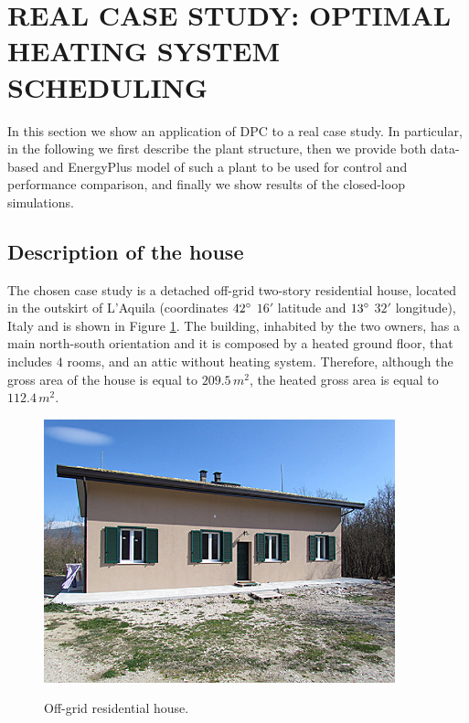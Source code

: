 \section{REAL CASE STUDY: OPTIMAL HEATING SYSTEM SCHEDULING} In this section we show an application of DPC to a real case study. In particular, in the following we first describe the plant structure, then we provide both data-based and EnergyPlus model of such a plant to be used for control and performance comparison, and finally we show results of the closed-loop simulations.

\subsection{Description of the house}\label{SS:descriptionHouse}
The chosen case study is a detached off-grid two-story residential house, located in the outskirt of L'Aquila (coordinates $42\degree$ $16'$ latitude and $13\degree$ $32'$ longitude), Italy and is shown in Figure \ref{F:house}. The building, inhabited by the two owners, has a main north-south orientation and it is composed by a heated ground floor, that includes $4$ rooms, and an attic without heating system. Therefore, although the gross area of the house is equal to $209.5\,m^2$, the heated gross area is equal to $112.4\,m^2$. 


\begin{figure}[h!]
	\begin{center}
		\includegraphics[width=24pc]{figures/Vista_sud.eps}
		\caption{Off-grid residential house.}
		\captionsetup{justification=centering}
		\label{F:house}
	\end{center}
\end{figure}

